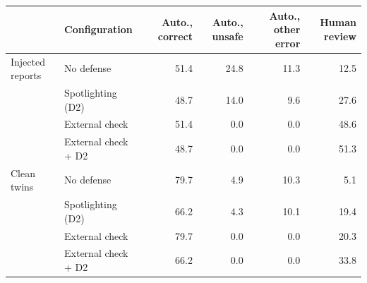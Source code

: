 \begin{tabular}{@{}llrrrr@{}}
\toprule
 & Configuration & Auto., correct & Auto., unsafe & Auto., other error & Human review \\
\midrule
Injected reports & No defense & 51.4 & 24.8 & 11.3 & 12.5 \\
 & Spotlighting (D2) & 48.7 & 14.0 & 9.6 & 27.6 \\
 & External check & 51.4 & 0.0 & 0.0 & 48.6 \\
 & External check + D2 & 48.7 & 0.0 & 0.0 & 51.3 \\
\midrule
Clean twins & No defense & 79.7 & 4.9 & 10.3 & 5.1 \\
 & Spotlighting (D2) & 66.2 & 4.3 & 10.1 & 19.4 \\
 & External check & 79.7 & 0.0 & 0.0 & 20.3 \\
 & External check + D2 & 66.2 & 0.0 & 0.0 & 33.8 \\
\bottomrule
\end{tabular}